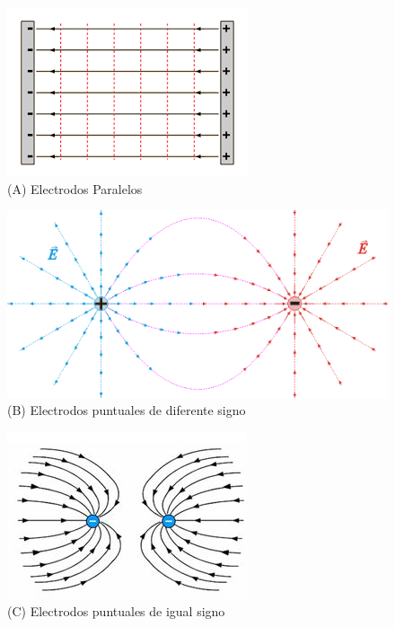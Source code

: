 \documentclass[letterpaper, 12pt]{report}
\begin{document}
\begin{figure}[H]
	\begin{center}
		\includegraphics[scale = 1]{./Images/A.png}
		\caption{(A) Electrodos Paralelos}
	\end{center}
\end{figure}

\begin{figure}[H]
	\begin{center}
		\includegraphics[scale = .8]{./Images/B.png}
		\caption{(B) Electrodos puntuales de diferente signo}
	\end{center}
\end{figure}

\begin{figure}[H]
	\begin{center}
		\includegraphics[scale = 1]{./Images/C.png}
		\caption{(C) Electrodos puntuales de igual signo}
	\end{center}
\end{figure}
\end{document}
